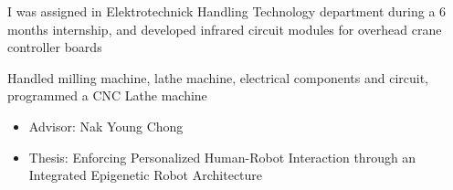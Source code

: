 \documentclass[10pt,a4paper]{altacv}
\begin{document}
I was assigned in Elektrotechnick Handling Technology department during a 6 months internship, and developed infrared circuit modules for overhead crane controller boards

\divider

Handled milling machine, lathe machine, electrical components and circuit, programmed a CNC Lathe machine

\divider


\begin{itemize}
\item Advisor: Nak Young Chong
\item Thesis: Enforcing Personalized Human-Robot Interaction through an Integrated Epigenetic Robot Architecture
\end{itemize}



\divider


\divider


\end{document}
